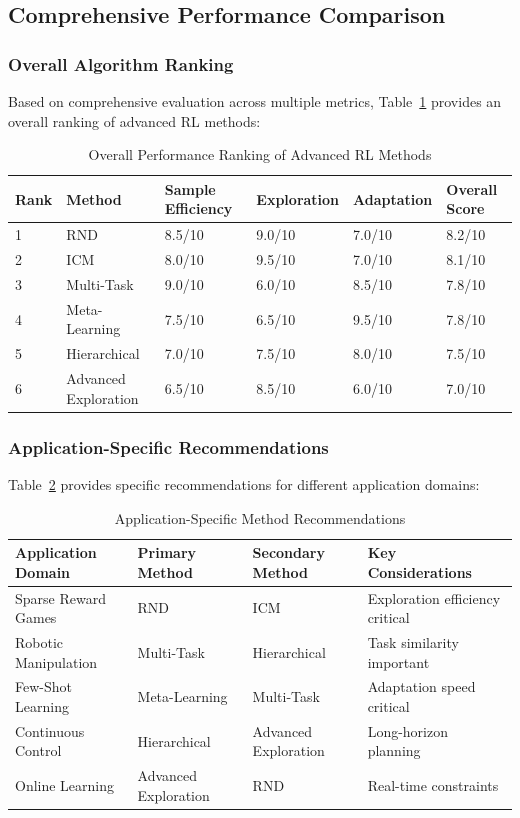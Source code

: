 \documentclass[12pt]{article}
\begin{document}
{{{\subsection{Comprehensive Performance Comparison}

\subsubsection{Overall Algorithm Ranking}

Based on comprehensive evaluation across multiple metrics, Table~\ref{tab:overall_ranking} provides an overall ranking of advanced RL methods:

\begin{table}[h]
\centering
\caption{Overall Performance Ranking of Advanced RL Methods}
\label{tab:overall_ranking}
\begin{tabular}{|l|l|l|l|l|l|}
\hline
\textbf{Rank} & \textbf{Method} & \textbf{Sample Efficiency} & \textbf{Exploration} & \textbf{Adaptation} & \textbf{Overall Score} \\
\hline
1 & RND & 8.5/10 & 9.0/10 & 7.0/10 & 8.2/10 \\
2 & ICM & 8.0/10 & 9.5/10 & 7.0/10 & 8.1/10 \\
3 & Multi-Task & 9.0/10 & 6.0/10 & 8.5/10 & 7.8/10 \\
4 & Meta-Learning & 7.5/10 & 6.5/10 & 9.5/10 & 7.8/10 \\
5 & Hierarchical & 7.0/10 & 7.5/10 & 8.0/10 & 7.5/10 \\
6 & Advanced Exploration & 6.5/10 & 8.5/10 & 6.0/10 & 7.0/10 \\
\hline
\end{tabular}
\end{table}

\subsubsection{Application-Specific Recommendations}

Table~\ref{tab:application_recommendations} provides specific recommendations for different application domains:

\begin{table}[h]
\centering
\caption{Application-Specific Method Recommendations}
\label{tab:application_recommendations}
\begin{tabular}{|l|l|l|l|}
\hline
\textbf{Application Domain} & \textbf{Primary Method} & \textbf{Secondary Method} & \textbf{Key Considerations} \\
\hline
Sparse Reward Games & RND & ICM & Exploration efficiency critical \\
Robotic Manipulation & Multi-Task & Hierarchical & Task similarity important \\
Few-Shot Learning & Meta-Learning & Multi-Task & Adaptation speed critical \\
Continuous Control & Hierarchical & Advanced Exploration & Long-horizon planning \\
Online Learning & Advanced Exploration & RND & Real-time constraints \\
\hline
\end{tabular}
\end{table}

}}}
\end{document}
